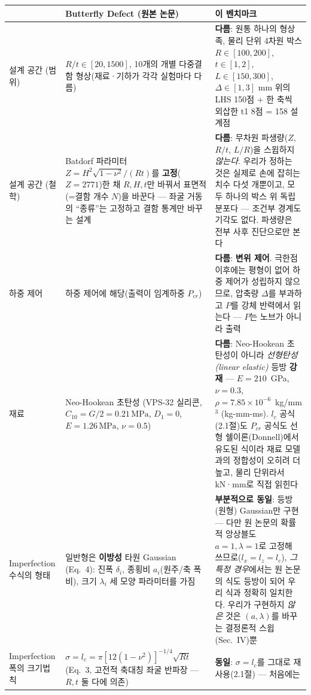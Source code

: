 \documentclass[11pt]{article}
\begin{document}
\begin{longtable}{@{}p{2.6cm}p{5.4cm}p{5.4cm}@{}}
\toprule
 & \textbf{Butterfly Defect (원본 논문)} & \textbf{이 벤치마크} \\
\midrule
\endhead
설계 공간 (범위) &
  $R/t \in [20, 1500]$, 10개의 개별 다중결함 형상(재료·기하가 각각 실험마다
  다름) &
  \textbf{다름}: 원통 하나의 형상족, 물리 단위 4차원 박스
  $R\in[100,200]$, $t\in[1,2]$, $L\in[150,300]$, $\Delta\in[1,3]$ mm 위의
  LHS 150점 + 한 축씩 외삽한 t1 8점 = 158 설계점 \\
\addlinespace
설계 공간 (철학) &
  Batdorf 파라미터 $Z=H^2\sqrt{1-\nu^2}/(Rt)$를 \textbf{고정}($Z{=}2771$)한
  채 $R,H,t$만 바꿔서 표면적(=결함 개수 $N$)을 바꾼다 --- 좌굴 거동의
  ``종류''는 고정하고 결함 통계만 바꾸는 설계 &
  \textbf{다름}: 무차원 파생량($Z$, $R/t$, $L/R$)을 스윕하지 \emph{않는다}.
  우리가 정하는 것은 실제로 손에 잡히는 치수 다섯 개뿐이고, 모두 하나의
  박스 위 독립 분포다 --- 조건부 경계도 기각도 없다. 파생량은 전부 사후
  진단으로만 본다 \\
\addlinespace
하중 제어 &
  하중 제어에 해당(출력이 임계하중 $P_{cr}$) &
  \textbf{다름}: \textbf{변위 제어}. 극한점 이후에는 평형이 없어 하중 제어가
  성립하지 않으므로, 압축량 $\Delta$를 부과하고 $P$를 강체 반력에서 읽는다
  --- $P$는 노브가 아니라 출력 \\
\addlinespace
재료 &
  Neo-Hookean 초탄성 (VPS-32 실리콘, $C_{10}=G/2=0.21\,\mathrm{MPa}$,
  $D_1{=}0$, $E=1.26\,\mathrm{MPa}$, $\nu{=}0.5$) &
  \textbf{다름}: Neo-Hookean 초탄성이 아니라 \emph{선형탄성(linear
  elastic)} 등방 \textbf{강재} --- $E{=}210$~GPa, $\nu{=}0.3$,
  $\rho{=}7.85\times10^{-6}$~kg/mm$^3$ (kg-mm-ms). $l_c$ 공식(2.1절)도
  $P_{cr}$ 공식도 선형 쉘이론(Donnell)에서 유도된 식이라 재료 모델과의
  정합성이 오히려 더 높고, 물리 단위라서 kN·mm로 직접 읽힌다 \\
\addlinespace
Imperfection 수식의 형태 &
  일반형은 \textbf{이방성} 타원 Gaussian (Eq.~4): 진폭 $\delta_i$, 종횡비
  $a_i$(원주/축 폭 비), 크기 $\lambda_i$ 세 모양 파라미터를 가짐 &
  \textbf{부분적으로 동일}: 등방(원형) Gaussian만 구현 --- 다만 원 논문의
  확률적 앙상블도 $a{=}1,\lambda{=}1$로 고정해 쓰므로($l_x{=}l_z{=}l_c$),
  \emph{그 특정 경우}에서는 원 논문의 식도 등방이 되어 우리 식과 정확히
  일치한다. 우리가 구현하지 \emph{않은} 것은 $(a,\lambda)$를 바꾸는
  결정론적 스윕(Sec.~IV)뿐 \\
\addlinespace
Imperfection 폭의 크기법칙 &
  $\sigma = l_c = \pi[12(1-\nu^2)]^{-1/4}\sqrt{Rt}$ (Eq.~3, 고전적 축대칭
  좌굴 반파장 --- $R,t$ 둘 다에 의존) &
  \textbf{동일}: $\sigma = l_c$를 그대로 재사용(2.1절) --- 처음에는

\end{longtable}
\end{document}

